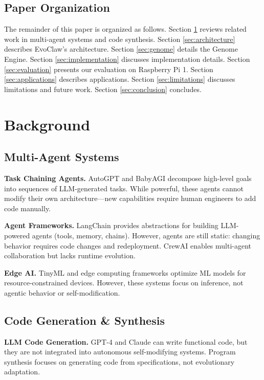 \documentclass{article}
\begin{document}
\subsection{Paper Organization}

The remainder of this paper is organized as follows. Section \ref{sec:background} reviews related work in multi-agent systems and code synthesis. Section \ref{sec:architecture} describes EvoClaw's architecture. Section \ref{sec:genome} details the Genome Engine. Section \ref{sec:implementation} discusses implementation details. Section \ref{sec:evaluation} presents our evaluation on Raspberry Pi 1. Section \ref{sec:applications} describes applications. Section \ref{sec:limitations} discusses limitations and future work. Section \ref{sec:conclusion} concludes.

\section{Background}\label{sec:background}

\subsection{Multi-Agent Systems}

\textbf{Task Chaining Agents.} AutoGPT \cite{auto_gpt} and BabyAGI \cite{babyagi} decompose high-level goals into sequences of LLM-generated tasks. While powerful, these agents cannot modify their own architecture—new capabilities require human engineers to add code manually.

\textbf{Agent Frameworks.} LangChain \cite{langchain} provides abstractions for building LLM-powered agents (tools, memory, chains). However, agents are still static: changing behavior requires code changes and redeployment. CrewAI \cite{crewei} enables multi-agent collaboration but lacks runtime evolution.

\textbf{Edge AI.} TinyML \cite{tinyml} and edge computing frameworks optimize ML models for resource-constrained devices. However, these systems focus on inference, not agentic behavior or self-modification.

\subsection{Code Generation \& Synthesis}

\textbf{LLM Code Generation.} GPT-4 \cite{gpt4} and Claude \cite{claude} can write functional code, but they are not integrated into autonomous self-modifying systems. Program synthesis \cite{program_synthesis} focuses on generating code from specifications, not evolutionary adaptation.
\end{document}

